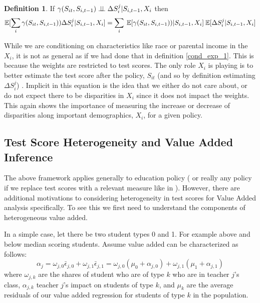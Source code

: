\documentclass[12pt]{article}
\theoremstyle{definition}
\theoremstyle{definition}
\theoremstyle{definition}
\theoremstyle{definition}
\newtheorem{definition}{Definition}
\begin{document}
    \begin{definition}
    \label{indep_def_used}
        If $ \gamma(S_{it}, S_{i,t-1}) \perp \!\!\! \perp \Delta S_i^j |S_{i,t-1}, X_i $ then
        \begin{equation*}
           \mathbb{E}[\sum_i \gamma(S_{it}, S_{i,t-1})) \Delta S_i^j| S_{i,t-1}, X_i]= \sum_i \: \mathbb{E}[\gamma(S_{it}, S_{i,t-1}))|S_{i,t-1}, X_i] \:\mathbb{E}[\Delta S_i^j|S_{i,t-1}, X_i] 
        \end{equation*}
    \end{definition}
    
    While we are conditioning on characteristics like race or parental income in the $X_i$, it is not as general as if we had done that in definition \ref{cond_exp_1}. This is because the weights are restricted to test scores. The only role $X_i$ is playing is to better estimate the test score after the policy, $S_{it}$ (and so by definition estimating $\Delta S_i^j$) . Implicit in this equation is the idea that we either do not care about, or do not expect there to be disparities in $X_i$ since it does not impact the weights. This again shows the importance of measuring the increase or decrease of disparities along important demographics, $X_i$, for a given policy. 
    
   \subsection{Test Score Heterogeneity and Value Added Inference}
   \label{va_hetero}
   
   The above framework applies generally to education policy ( or really any policy if we replace test scores with a relevant measure like in \citet{mather_2022}). However, there are additional motivations to considering heterogeneity in test scores for Value Added analysis specifically. To see this we first need to understand the components of heterogeneous value added. 
   
    In a simple case, let there be two student types 0 and 1. For example above and below median scoring students. Assume value added can be characterized as follows:
    \[
    \alpha_j = \omega_{j,0}\bar{\epsilon}_{j,0}  + \omega_{j,1}\bar{\epsilon}_{j,1} =  \omega_{j,0}(\mu_0 +\alpha_{j,0}) + \omega_{j,1}(\mu_1 +\alpha_{j,1})
    \]
    \noindent where $\omega_{j,k}$ are the shares of student who are of type $k$ who are in teacher $j$'s class, $\alpha_{j,k}$ teacher $j$'s  impact on students of type $k$, and $\mu_k$ are the average residuals of our value added regression for students of type $k$ in the population.
    
\end{document}
